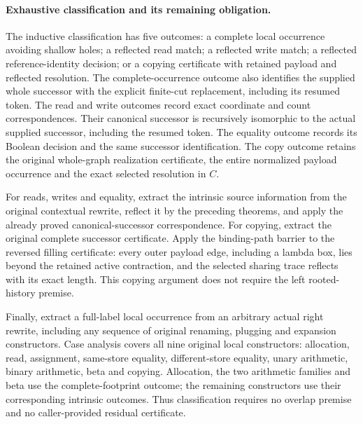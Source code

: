 \paragraph{Exhaustive classification and its remaining obligation.}
The inductive classification has five outcomes: a complete local occurrence
avoiding shallow holes; a reflected read match; a reflected write match; a
reflected reference-identity decision; or a copying certificate with retained
payload and reflected resolution. The complete-occurrence outcome also identifies the supplied whole successor
with the explicit finite-cut replacement, including its resumed token. The
read and write outcomes record exact coordinate and count correspondences. Their canonical successor is recursively
isomorphic to the actual supplied successor, including the resumed token.
The equality outcome records its Boolean decision and the same successor
identification. The copy outcome retains the original whole-graph realization
certificate, the entire normalized payload occurrence and the exact selected
resolution in $C$.

For reads, writes and equality, extract the intrinsic source information from
the original contextual rewrite, reflect it by the preceding theorems, and
apply the already proved canonical-successor correspondence. For copying,
extract the original complete successor certificate. Apply the binding-path
barrier to the reversed filling certificate: every outer payload edge,
including a lambda box, lies beyond the retained active contraction, and the
selected sharing trace reflects with its exact length. This copying argument
does not require the left rooted-history premise.
\par{}

Finally, extract a full-label local occurrence from an arbitrary actual right
rewrite, including any sequence of original renaming, plugging and expansion
constructors. Case analysis covers all nine original local constructors:
allocation, read, assignment, same-store equality, different-store equality,
unary arithmetic, binary arithmetic, beta and copying. Allocation, the two
arithmetic families and beta use the complete-footprint outcome; the remaining
constructors use their corresponding intrinsic outcomes. Thus classification
requires no overlap premise and no caller-provided residual certificate.

